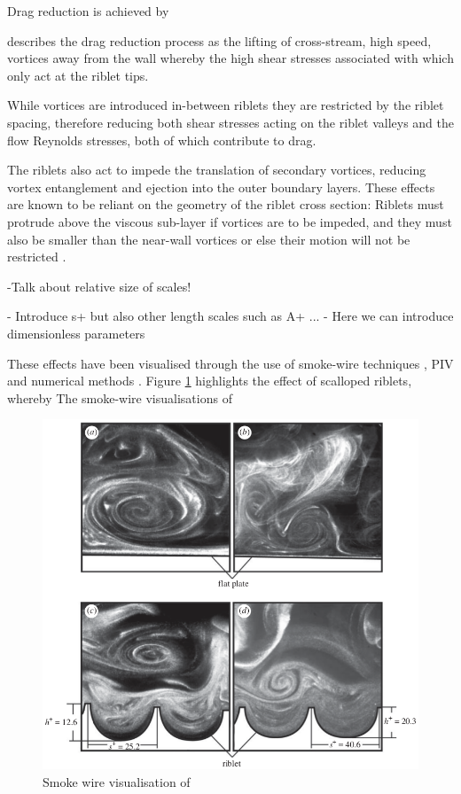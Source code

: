 \documentclass[12pt,oneside,a4paper]{article}
\begin{document}
Drag reduction is achieved by 

\cite{dean2010} describes the drag reduction process as the lifting of cross-stream, high speed, vortices away from the wall whereby the high shear stresses associated with which only act at the riblet tips.


While vortices are introduced in-between riblets they are restricted by the riblet spacing, therefore reducing both shear stresses acting on the riblet valleys and the flow Reynolds stresses, both of which contribute to drag.

The riblets also act to impede the translation of secondary vortices, reducing vortex entanglement and ejection into the outer boundary layers. These effects are known to be reliant on the geometry of the riblet cross section: Riblets must protrude above the viscous sub-layer if vortices are to be impeded, and they must also be smaller than the near-wall vortices or else their motion will not be restricted \citep{dean2010}. 
 
 -Talk about relative size of scales! 
 
 - Introduce s+ but also other length scales such as A+ ...
 - Here we can introduce dimensionless parameters
 
 
 
  These effects have been visualised through the use of smoke-wire techniques \citep{lee2001}, PIV \citep{lee2008} and numerical methods \citep{goldstein1995}. Figure \ref{figure:literatureReview:smokeWireVisualisation} highlights the effect of scalloped riblets, whereby 
  The smoke-wire visualisations of \cite{lee2001} 
  
\begin{figure}[!t]
\centering
\includegraphics[width=12cm]{images/smokeWireVisualisation.png}
\caption{Smoke wire visualisation of \cite{lee2001}}
\label{figure:literatureReview:smokeWireVisualisation}
\end{figure}
 
\end{document}
